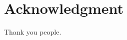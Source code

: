 \vspace*{\fill}

\section*{Acknowledgment}
Thank you people.

\thispagestyle{empty}

\cleardoublepage